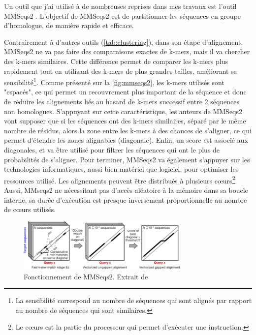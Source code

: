 Un outil que j'ai utilisé à de nombreuses reprises dans mes travaux est l'outil MMSeqs2 \cite{steinegger_mmseqs2_2017}. L'objectif de MMSeqs2 est de partitionner les séquences en groupe d'homologue, de manière rapide et efficace.

Contrairement à d'autres outils (\autoref{tab:clustering}), dans son étape d'alignement, MMSeqs2 ne va pas faire des comparaisons exactes de k-mers, mais il va chercher des k-mers similaires. Cette différence permet de comparer les k-mers plus rapidement tout en utilisant des k-mers de plus grandes tailles, améliorant sa sensibilité\footnote{La sensibilité correspond au nombre de séquences qui sont alignés par rapport au nombre de séquences qui sont similaires.}. Comme présenté sur la \autoref{fig:mmseqs2}, les k-mers utilisés sont "espacés", ce qui permet un recouvrement plus important de la séquence et donc de réduire les alignements liés au hasard de k-mers successif entre 2 séquences non homologues. S'appuyant sur cette caractéristique, les auteurs de MMSeqs2 vont supposer que si les séquences ont des k-mers similaires, séparé par le même nombre de résidus, alors la zone entre les k-mers à des chances de s'aligner, ce qui permet d'étendre les zones alignables (diagonale). Enfin, un score est associé aux diagonales, et va être utilisé pour filtrer les séquences qui ont le plus de probabilités de s'aligner. Pour terminer, MMSeqs2 va également s'appuyer sur les technologies informatiques, aussi bien matériel que logiciel, pour optimiser les ressources utilisé. Les alignements peuvent être distribués à plusieurs c\oe urs\footnote{Le c\oe urs est la partie du processeur qui permet d'exécuter une instruction.}. Aussi, MMseqs2 ne nécessitant pas d'accès aléatoire à la mémoire dans sa boucle interne, sa durée d'exécution est presque inversement proportionnelle au nombre de c\oe urs utilisés.

\begin{figure}[htbp]
    \centering
    \includegraphics[width=0.75\textwidth]{images/mmseqs2.png}
    \caption[Fonctionnement de MMSeqs2]{Fonctionnement de MMSeqs2. Extrait de \cite{steinegger_mmseqs2_2017}}
    \label{fig:mmseqs2}
\end{figure}

